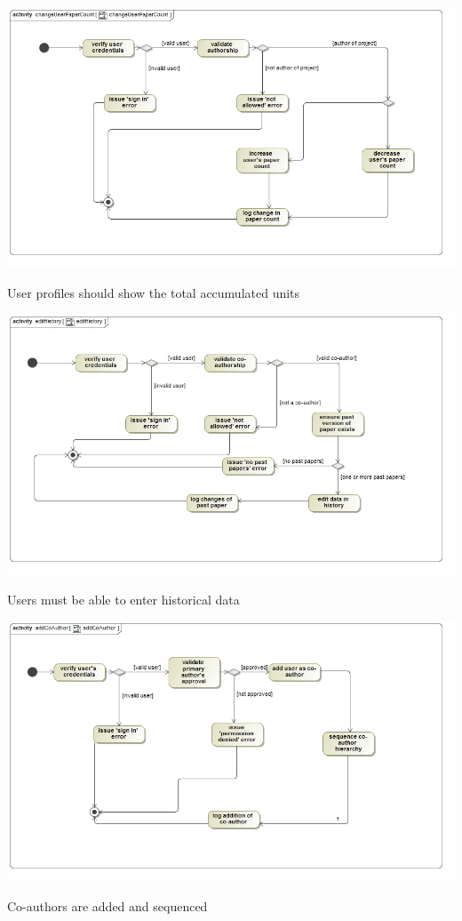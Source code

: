 \documentclass[a4paper,12pt]{report}
\begin{document}
\begin{flushleft}
	\includegraphics[scale=0.5]{./images/act__changeUserPaperCount__changeUserPaperCount.jpg} 
	\begin{center}
		User profiles should show the total accumulated units
	\end{center}

	\includegraphics[scale=0.5]{./images/act__editHistory__editHistory.jpg} 
	\begin{center}
		Users must be able to enter historical data
	\end{center}
\end{flushleft}

\newpage

\begin{flushleft}
	\includegraphics[scale=0.5]{./images/act__addCoAuthor__addCoAuthor.jpg}  
	\begin{center}
		Co-authors are added and sequenced
	\end{center}
\end{flushleft}
\end{document}
